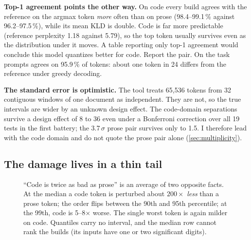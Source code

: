 \textbf{Top-1 agreement points the other way.} On code every build agrees with the reference on the
argmax token \emph{more} often than on prose (98.4--99.1\,\% against 96.2--97.5\,\%), while its mean
KLD is double. Code is far more predictable (reference perplexity 1.18 against 5.79), so the top token
usually survives even as the distribution under it moves. A table reporting only top-1 agreement would
conclude this model quantizes better for code. Report the pair. On the task prompts \Qfour{} agrees on
95.9\,\% of tokens: about one token in 24 differs from the reference under greedy decoding.

\textbf{The standard error is optimistic.} The tool treats 65{,}536 tokens from 32 contiguous windows
of one document as independent. They are not, so the true intervals are wider by an unknown design
effect. The code-domain separations survive a design effect of 8 to 36 even under a Bonferroni
correction over all 19 tests in the first battery; the 3.7\,$\sigma$ prose pair survives only to 1.5.
I therefore lead with the code domain and do not quote the prose pair alone
(\cref{sec:multiplicity}).

\subsection{The damage lives in a thin tail}\label{sec:tail}

\begin{figure}[t]
\centering
{}
\caption{``Code is twice as bad as prose'' is an average of two opposite facts. At the median a code
token is perturbed about $200\times$ \emph{less} than a prose token; the order flips between the 90th
and 95th percentile; at the 99th, code is 5--8$\times$ worse. The single worst token is again milder on
code. Quantiles carry no interval, and the median row cannot rank the builds (its inputs have one or
two significant digits).}\label{fig:tail}
\end{figure}

